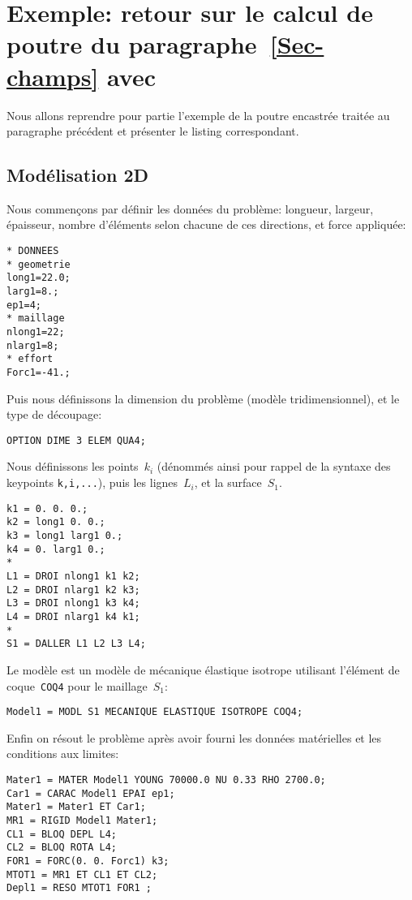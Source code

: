 \section{Exemple: retour sur le calcul de poutre du paragraphe~\ref{Sec-champs} avec \castem}
Nous allons reprendre pour partie l'exemple de la poutre encastrée traitée au paragraphe précédent et présenter le listing \castem correspondant.

\medskip
\subsection{Modélisation 2D}

Nous commençons par définir les données du problème: longueur, largeur, épaisseur, nombre d'éléments selon chacune de ces directions, et force appliquée:
\lstset{language=castem}
\begin{lstlisting}[firstnumber=1]
* DONNEES
* geometrie
long1=22.0;
larg1=8.;
ep1=4;
* maillage
nlong1=22;
nlarg1=8;
* effort
Forc1=-41.;
\end{lstlisting}

Puis nous définissons la dimension du problème (modèle tridimensionnel), et le type de découpage:
\begin{lstlisting}[firstnumber=last]
OPTION DIME 3 ELEM QUA4;
\end{lstlisting}

Nous définissons les points~$k_i$ (dénommés ainsi pour rappel de la syntaxe \ansys des keypoints \verb|k,i,...|), puis les lignes~$L_i$, et la surface~$S_1$.
\begin{lstlisting}[firstnumber=last]
k1 = 0. 0. 0.;
k2 = long1 0. 0.;
k3 = long1 larg1 0.;
k4 = 0. larg1 0.;
*
L1 = DROI nlong1 k1 k2;
L2 = DROI nlarg1 k2 k3;
L3 = DROI nlong1 k3 k4;
L4 = DROI nlarg1 k4 k1;
*
S1 = DALLER L1 L2 L3 L4;
\end{lstlisting}

Le modèle est un modèle de mécanique élastique isotrope utilisant l'élément de coque~\lstinline!COQ4! pour le maillage~$S_1$:
\begin{lstlisting}[firstnumber=last]
Model1 = MODL S1 MECANIQUE ELASTIQUE ISOTROPE COQ4;
\end{lstlisting}

Enfin on résout le problème après avoir fourni les données matérielles et les conditions aux limites:
\begin{lstlisting}[firstnumber=last]
Mater1 = MATER Model1 YOUNG 70000.0 NU 0.33 RHO 2700.0;
Car1 = CARAC Model1 EPAI ep1;
Mater1 = Mater1 ET Car1;
MR1 = RIGID Model1 Mater1;
CL1 = BLOQ DEPL L4;
CL2 = BLOQ ROTA L4;
FOR1 = FORC(0. 0. Forc1) k3;
MTOT1 = MR1 ET CL1 ET CL2;
Depl1 = RESO MTOT1 FOR1 ;
\end{lstlisting}

